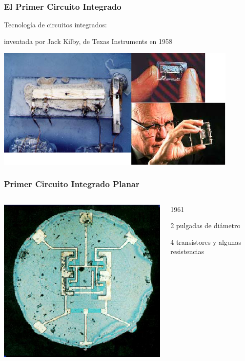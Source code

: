 \documentclass[t,aspectratio=169,10pt]{beamer}
\begin{document}
\begin{frame}
\frametitle{El Primer Circuito Integrado}

\centering
Tecnología de circuitos integrados:

inventada por Jack Kilby, de Texas Instruments en 1958

\includegraphics[width=12cm]{first-IC}
\end{frame}


\begin{frame}
\frametitle{Primer Circuito Integrado Planar}

\begin{columns}

	\begin{column}{0.5\textwidth}
 
		\centering
		\includegraphics[width=\textwidth]{first-planarIC}
  
	\end{column}
 
	\begin{column}{0.5\textwidth}
	1961
	
	2 pulgadas de diámetro
	
	4 transistores y algunas resistencias
 
\end{column}

\end{columns}

\end{frame}
\end{document}
